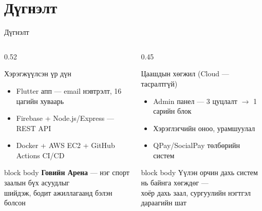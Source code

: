 \documentclass[14pt,aspectratio=169]{beamer}
\newcommand{\YES}{\textcolor{okgreen}{\checkmark}}
\begin{document}
\section{Дүгнэлт}
\begin{frame}{Дүгнэлт}
  \begin{columns}[T]
    \begin{column}{0.52\textwidth}
      \begin{block}{Хэрэгжүүлсэн үр дүн}
        \begin{itemize}
          \item[\YES] Flutter апп — email нэвтрэлт, 16 цагийн хуваарь
          \item[\YES] Firebase + Node.js/Express — REST API
          \item[\YES] Docker + AWS EC2 + GitHub Actions CI/CD
        \end{itemize}
      \end{block}
      \vspace{4pt}
      \begin{beamercolorbox}[sep=4pt,rounded=true]{block body}
        \small \textbf{Говийн Арена} — нэг спорт заалын бүх асуудлыг\\
        шийдэж, бодит ажиллагаанд бэлэн болсон
      \end{beamercolorbox}
    \end{column}
    \begin{column}{0.45\textwidth}
      \begin{alertblock}{Цаашдын хөгжил (Cloud — тасралтгүй)}
        \begin{itemize}
          \item Admin панел — 3 цуцлалт $\to$ 1 сарийн блок
          \item Хэрэглэгчийн оноо, урамшуулал
          \item QPay/SocialPay төлбөрийн систем
        \end{itemize}
      \end{alertblock}
      \vspace{4pt}
      \begin{beamercolorbox}[sep=4pt,rounded=true]{block body}
        \tiny Үүлэн орчин дахь систем нь байнга хөгждөг —\\
        хоёр дахь заал, сургуулийн нэгтгэл дараагийн шат
      \end{beamercolorbox}
    \end{column}
  \end{columns}
\end{frame}
\end{document}

